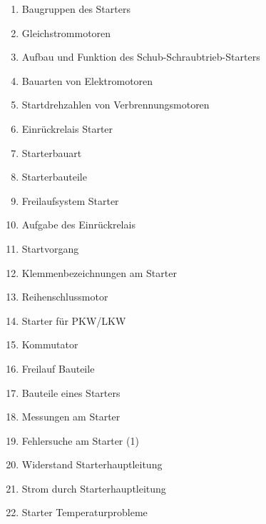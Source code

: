 \begin{enumerate}
\item
  Baugruppen des Starters\\
\item
  Gleichstrommotoren\\
\item
  Aufbau und Funktion des Schub-Schraubtrieb-Starters\\
\item
  Bauarten von Elektromotoren\\
\item
  Startdrehzahlen von Verbrennungsmotoren\\
\item
  Einrückrelais Starter\\
\item
  Starterbauart\\
\item
  Starterbauteile\\
\item
  Freilaufsystem Starter\\
\item
  Aufgabe des Einrückrelais\\
\item
  Startvorgang\\
\item
  Klemmenbezeichnungen am Starter\\
\item
  Reihenschlussmotor\\
\item
  Starter für PKW/LKW\\
\item
  Kommutator\\
\item
  Freilauf Bauteile\\
\item
  Bauteile eines Starters\\
\item
  Messungen am Starter\\
\item
  Fehlersuche am Starter (1)\\
\item
  Widerstand Starterhauptleitung\\
\item
  Strom durch Starterhauptleitung\\
\item
  Starter Temperaturprobleme
\end{enumerate}


